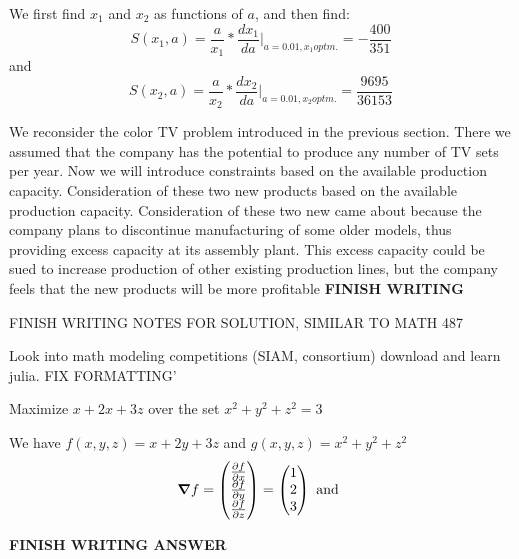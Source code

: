 \documentclass{article}
\begin{document}
We first find \(x_1\) and \(x_2\) as functions of \(a\), and then find: \\
\[
    S(x_1, a)=\frac{a}{x_1}*\frac{dx_1}{da}|_{a=0.01, x_1 optm.}=-\frac{400}{351}
\]
and \\
\[
    S(x_2,a)=\frac{a}{x_2}*\frac{dx_2}{da}|_{a=0.01, x_2 optm.}=\frac{9695}{36153}
\]  

\begin{eg}
    We reconsider the color TV problem introduced in the previous section. There we assumed 
    that the company has the potential to produce any number of TV sets per year. Now we will 
    introduce constraints based on the available production capacity. Consideration of these 
    two new products based on the available production capacity. Consideration of these two new 
    came about because the company plans to discontinue manufacturing of some older models, thus 
    providing excess capacity at its assembly plant. This excess capacity could be sued to increase production 
    of other existing production lines, but the company feels that the new products will be more profitable 
    \textbf{FINISH WRITING}
\end{eg}

FINISH WRITING NOTES FOR SOLUTION, SIMILAR TO MATH 487

Look into math modeling competitions (SIAM, consortium)
download and learn julia. FIX FORMATTING'

\begin{eg}
    Maximize \(x+2x+3z\) over the set \(x^2+y^2+z^2=3\) \\
\end{eg}
\begin{answer}
    We have \(f(x,y,z)=x+2y+3z\) and \(g(x,y,z)=x^2+y^2+z^2\)\\
    \[
        \grad{f}=\begin{pmatrix}
            \frac{\partial f}{\partial x} \\\frac{\partial f}{\partial y} \\ \frac{\partial f}{\partial z}
        \end{pmatrix}=\begin{pmatrix}
        1 \\ 2 \\ 3
        \end{pmatrix}
        \text{ and }
    \]
\end{answer}
\textbf{FINISH WRITING ANSWER}
\end{document}

